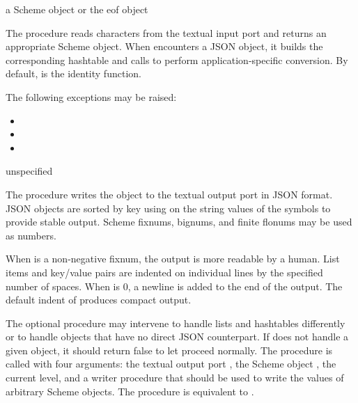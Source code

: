 \begin{procedure}
\end{procedure}
\returns{} a Scheme object or the eof object

The  procedure reads characters from the textual
input port  and returns an appropriate Scheme object.
When  encounters a JSON object, it builds
the corresponding hashtable and calls 
to perform application-specific conversion.
By default,  is the identity function.

The following exceptions may be raised:
\begin{itemize}
\item {}
\item {}
\item {}
\end{itemize}

\begin{procedure}
\end{procedure}
\returns{} unspecified

The  procedure writes the object  to the
textual output port  in JSON format. JSON objects are sorted
by key using  on the string values of the symbols to
provide stable output. Scheme fixnums, bignums, and finite flonums may
be used as numbers.

When  is a non-negative fixnum, the output is more
readable by a human. List items and key/value pairs are indented on
individual lines by the specified number of spaces. When 
is 0, a newline is added to the end of the output. The default indent
of  produces compact output.

The optional  procedure may intervene to handle
lists and hashtables differently or to handle objects that have no
direct JSON counterpart.  If  does not handle a
given object, it should return false to let  proceed
normally.  The  procedure is called with four
arguments: the textual output port , the Scheme object
, the current  level, and a writer procedure
 that should be used to write the values of arbitrary Scheme
objects.  The  procedure is equivalent to
.

